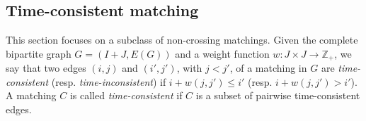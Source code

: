 \documentclass[11pt]{article}
\theoremstyle{plain}%
\theoremstyle{definition} \newtheorem{lem}{Lemma}[section]
\theoremstyle{definition} \newtheorem{claim}{Claim}[lem]
\theoremstyle{definition} \newtheorem{theorem}{Theorem}[section]
\theoremstyle{definition} \newtheorem{exo}{Exercice n$^\circ$}
\theoremstyle{definition} \newtheorem{quest}{}[exo]
\theoremstyle{definition} \newtheorem{sousquest}{}[quest]
\theoremstyle{remark}
\theoremstyle{definition}
\begin{document}
%
%
%
%
\subsection{ Time-consistent matching}
This section focuses on a subclass of non-crossing matchings. 
Given the complete bipartite graph $G=(I+J, E(G))$ and a weight function $w : J \times J \rightarrow \mathbb{Z}_+$, we say that two edges $(i,j)$ and $(i',j')$,
with $j <j'$, of a matching in $G$ are \emph{ time-consistent} (resp. \emph{ time-inconsistent}) if   $i+w(j,j') \leq i'$ (resp. $i+w(j,j') > i'$). A matching $C$ is called {\it time-consistent} if $C$ is a subset of pairwise time-consistent edges.
\end{document}
